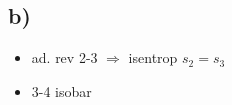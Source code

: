 

\subsection*{b)}
\begin{itemize}
    \item ad. rev 2-3 $\Rightarrow$ isentrop $s_2 = s_3$
    \item 3-4 isobar
\end{itemize}